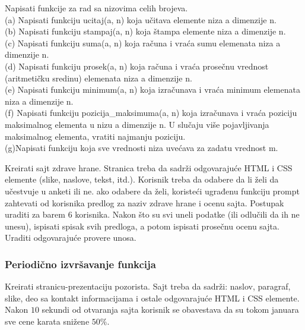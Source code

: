 \begin{primer}
Napisati funkcije za rad sa nizovima celih brojeva.\\
(a) Napisati funkciju ucitaj(a, n) koja učitava elemente niza a dimenzije n.\\
(b) Napisati funkciju stampaj(a, n) koja štampa elemente niza a dimenzije n.\\
(c) Napisati funkciju suma(a, n) koja računa i vraća sumu
elemenata niza a dimenzije n.\\
(d) Napisati funkciju prosek(a, n) koja računa i vraća prosečnu
vrednost (aritmetičku sredinu) elemenata niza a dimenzije n.\\
(e) Napisati funkciju minimum(a, n) koja izračunava i vraća
minimum elemenata niza a dimenzije n.\\
(f) Napisati funkciju pozicija\_maksimuma(a, n) koja izračunava
i vraća poziciju maksimalnog elementa u nizu a dimenzije n. U slučaju
više pojavljivanja maksimalnog elementa, vratiti najmanju poziciju.\\
(g)Napisati funkciju koja sve vrednosti niza uvećava za zadatu vrednost m.
\end{primer}

\begin{primer}
Kreirati sajt zdrave hrane. Stranica treba da sadrži odgovarajuće HTML i CSS elemente (slike, naslove, tekst, itd.). Korisnik treba da odabere da li želi da učestvuje u anketi ili ne. ako odabere da želi, koristeći ugrađenu funkciju prompt zahtevati od korisnika predlog za naziv zdrave hrane i ocenu sajta. Postupak uraditi za barem 6 korisnika. Nakon što su svi uneli podatke (ili odlučili da ih ne unesu), ispisati spisak svih predloga, a potom ispisati prosečnu ocenu sajta. Uraditi odgovarajuće provere unosa.   
\end{primer}

\subsubsection{Periodično izvršavanje funkcija}
\begin{primer}
Kreirati stranicu-prezentaciju pozorista. Sajt treba da sadrži: naslov, paragraf, slike, deo sa kontakt informacijama i ostale odgovarajuće HTML i CSS elemente. Nakon $10$ sekundi od otvaranja sajta korisnik se obavestava da su tokom januara sve cene karata snižene $50\%$. 
\end{primer}

